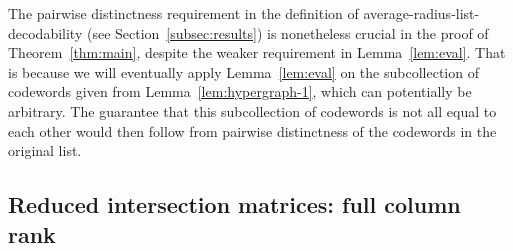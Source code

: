 \documentclass{article}[11pt]
\begin{document}
\begin{remark}
The pairwise distinctness requirement in the definition of average-radius-list-decodability (see Section~\ref{subsec:results}) is nonetheless crucial in the proof of Theorem~\ref{thm:main}, despite the weaker requirement in Lemma~\ref{lem:eval}. That is because we will eventually apply Lemma~\ref{lem:eval} on the subcollection of codewords given from Lemma~\ref{lem:hypergraph-1}, which can potentially be arbitrary. The guarantee that this subcollection of codewords is not all equal to each other would then follow from pairwise distinctness of the codewords in the original list.
\end{remark}

\subsection{Reduced intersection matrices: full column rank}
\end{document}
